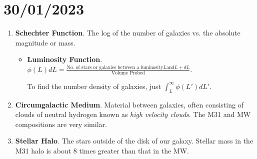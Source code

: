 \documentclass[a4paper]{article}
\begin{document}
\section{30/01/2023}
\begin{enumerate}
  \item {\bf Schechter Function}. The log of the number of galaxies vs. the absolute magnitude or mass.
    \begin{itemize}
      \item {\bf Luminosity Function}. $\phi(L)dL=\frac{\text{No. of stars or galaxies between a luminosity} L \text{and} L+dL}{\text{Volume Probed}}$. 

        To find the number density of galaxies, just $\int_{L}^{\infty}\phi(L')dL'$. 


    \end{itemize}

  \item {\bf Circumgalactic Medium}. Material between galaxies, often consisting of clouds of neutral hydrogen known as {\it high velocity clouds}. The M31 and MW compositions are very similar.
  \item {\bf Stellar Halo}. The stars outside of the disk of our galaxy. Stellar mass in the M31 halo is about 8 times greater than that in the MW. 
\end{enumerate}
\end{document}
